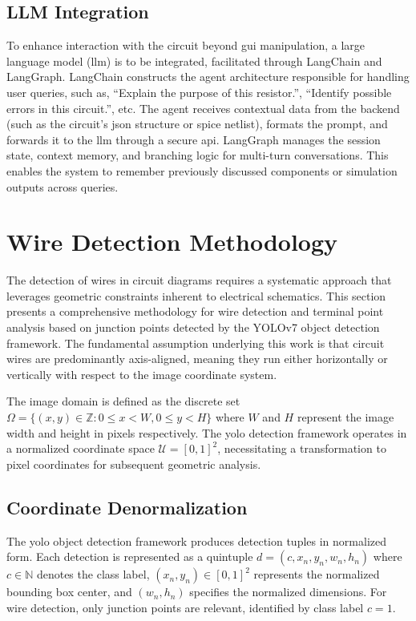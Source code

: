 \subsection{LLM Integration}

To enhance interaction with the circuit beyond \gls{gui} manipulation, a large language model (\gls{llm}) is to be integrated, facilitated through LangChain and LangGraph. LangChain constructs the agent architecture responsible for handling user queries, such as, ``Explain the purpose of this resistor.'', ``Identify possible errors in this circuit.'', etc. The agent receives contextual data from the backend (such as the circuit's \gls{json} structure or \gls{spice} netlist), formats the prompt, and forwards it to the \gls{llm} through a secure \gls{api}. LangGraph manages the session state, context memory, and branching logic for multi-turn conversations. This enables the system to remember previously discussed components or simulation outputs across queries.

\section{Wire Detection Methodology}

The detection of wires in circuit diagrams requires a systematic approach that leverages geometric constraints inherent to electrical schematics. This section presents a comprehensive methodology for wire detection and terminal point analysis based on junction points detected by the YOLOv7 object detection framework. The fundamental assumption underlying this work is that circuit wires are predominantly axis-aligned, meaning they run either horizontally or vertically with respect to the image coordinate system.

The image domain is defined as the discrete set $\Omega = \{(x,y) \in \mathbb{Z} : 0 \le x < W, 0 \le y < H\}$ where $W$ and $H$ represent the image width and height in pixels respectively. The \gls{yolo} detection framework operates in a normalized coordinate space $\mathcal{U} = [0,1]^2$, necessitating a transformation to pixel coordinates for subsequent geometric analysis.

\subsection{Coordinate Denormalization}

The \gls{yolo} object detection framework produces detection tuples in normalized form. Each detection is represented as a quintuple $d = (c, x_n, y_n, w_n, h_n)$ where $c \in \mathbb{N}$ denotes the class label, $(x_n, y_n) \in [0,1]^2$ represents the normalized bounding box center, and $(w_n, h_n)$ specifies the normalized dimensions. For wire detection, only junction points are relevant, identified by class label $c = 1$.

